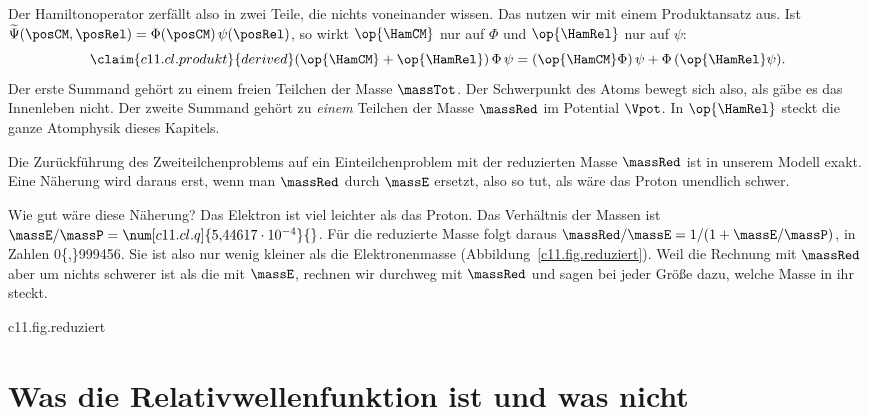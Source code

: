 Der Hamiltonoperator zerfällt also in zwei Teile, die nichts voneinander wissen. Das
nutzen wir mit einem Produktansatz aus. Ist $\widetilde{\Psi}(\posCM, \posRel) =
\Phi(\posCM)\,\psi(\posRel)$, so wirkt $\op{\HamCM}$ nur auf $\Phi$ und $\op{\HamRel}$ nur auf
$\psi$:
\begin{equation}\label{c11.eq.produkt}\claim{c11.cl.produkt}{derived}
  (\op{\HamCM} + \op{\HamRel})\,\Phi\,\psi
  = (\op{\HamCM}\Phi)\,\psi + \Phi\,(\op{\HamRel}\psi).
\end{equation}
Der erste Summand gehört zu einem freien Teilchen der Masse $\massTot$. Der Schwerpunkt
des Atoms bewegt sich also, als gäbe es das Innenleben nicht. Der zweite Summand gehört
zu \emph{einem} Teilchen der Masse $\massRed$ im Potential $\Vpot$. In $\op{\HamRel}$ steckt
die ganze Atomphysik dieses Kapitels.

\begin{merksatz}
  Die Zurückführung des Zweiteilchenproblems auf ein Einteilchenproblem mit der
  reduzierten Masse $\massRed$ ist in unserem Modell exakt. Eine Näherung wird daraus
  erst, wenn man $\massRed$ durch $\massE$ ersetzt, also so tut, als wäre das Proton
  unendlich schwer.
\end{merksatz}

Wie gut wäre diese Näherung? Das Elektron ist viel leichter als das Proton. Das
Verhältnis der Massen ist $\massE/\massP = \num[c11.cl.q]{5{,}44617 \cdot 10^{-4}}{}$.
Für die reduzierte Masse folgt daraus $\massRed/\massE = 1/(1 + \massE/\massP)$, in
Zahlen \num[c11.cl.mu-ratio]{0{,}999456}{}. Sie ist also nur wenig kleiner als die
Elektronenmasse (Abbildung~\ref{c11.fig.reduziert}). Weil die Rechnung mit $\massRed$ aber um nichts schwerer ist
als die mit $\massE$, rechnen wir durchweg mit $\massRed$ und sagen bei jeder Größe
dazu, welche Masse in ihr steckt.

\begin{tpcfigure}{c11.fig.reduziert}
  \caption{Die reduzierte Masse nach , in Einheiten der Elektronenmasse, als Funktion des Massenverhältnisses; die waagerechte Achse ist logarithmisch. Bei gleichen Massen ist $\massRed$ die Hälfte von $\massE$. Je schwerer das zweite Teilchen, desto näher kommt $\massRed$ der Elektronenmasse; der rechte Punkt ist Wasserstoff.}
\end{tpcfigure}

\section{Was die Relativwellenfunktion ist und was nicht}\label{c11.s3}

